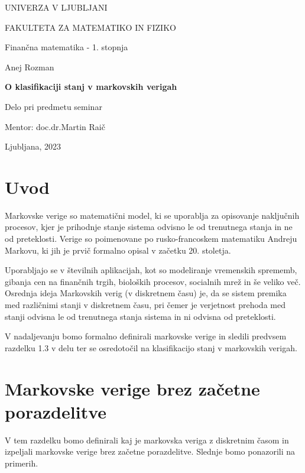 \documentclass[a4paper,12pt]{article}
\begin{document}
\begin{titlepage}
UNIVERZA V LJUBLJANI

FAKULTETA ZA MATEMATIKO IN FIZIKO

\vspace{0.5cm}
Finančna matematika - 1. stopnja

\begin{center}
   \vspace{7cm}
   Anej Rozman

   \vspace{0.4cm}
   \textbf{\Large{O klasifikaciji stanj v markovskih verigah}}
   \vspace{0.3cm}

   Delo pri predmetu seminar

   \vspace{1cm}
   Mentor: doc.\@ dr.\@ Martin Raič
\end{center}
\vfill
Ljubljana, 2023     
\thispagestyle{empty}
\end{titlepage}
\newpage

\tableofcontents


\newpage

\section{Uvod}

Markovske verige so matematični model, ki se uporablja za opisovanje naključnih procesov, kjer je prihodnje stanje sistema odvisno le od trenutnega stanja in ne od preteklosti. Verige so poimenovane po rusko-francoskem matematiku Andreju Markovu, ki jih je prvič formalno opisal v začetku 20. stoletja.

Uporabljajo se v številnih aplikacijah, kot so modeliranje vremenskih sprememb, gibanja cen na finančnih trgih, bioloških procesov, socialnih mrež in še veliko več. Osrednja ideja Markovskih verig (v diskretnem času) je, da se sistem premika med različnimi stanji v diskretnem času, pri čemer je verjetnost prehoda med stanji odvisna le od trenutnega stanja sistema in ni odvisna od preteklosti.

V nadaljevanju bomo formalno definirali markovske verige in sledili predvsem razdelku 1.3 v delu \cite{RickDurrett} ter se osredotočil na klasifikacijo stanj v markovskih verigah.




\newpage

\section{Markovske verige brez začetne porazdelitve}
V tem razdelku bomo definirali kaj je markovska veriga z diskretnim časom in izpeljali markovske verige brez začetne porazdelitve. 
Slednje bomo ponazorili na primerih.
\end{document}
